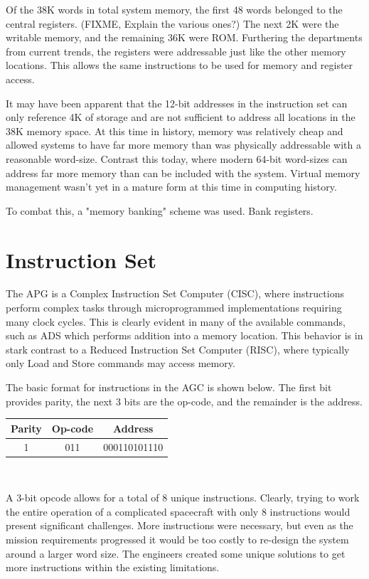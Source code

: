 \documentclass[a4paper,11pt]{article}
\begin{document}
Of the 38K words in total system memory, the first 48 words belonged to the central registers.  (FIXME, Explain the various ones?)  The next 2K were the writable memory, and the remaining 36K were ROM.  Furthering the departments from current trends, the registers were addressable just like the other memory locations.  This allows the same instructions to be used for memory and register access.  

It may have been apparent that the 12-bit addresses in the instruction set can only reference 4K of storage and are not sufficient to address all locations in the 38K memory space.  At this time in history, memory was relatively cheap and allowed systems to have far more memory than was physically addressable with a reasonable word-size.  Contrast this today, where modern 64-bit word-sizes can address far more memory than can be included with the system.  
Virtual memory management wasn't yet in a mature form at this time in computing history. 

To combat this, a "memory banking" scheme was used. Bank registers.


\section{Instruction Set}
The APG is a Complex Instruction Set Computer (CISC), where instructions perform complex tasks through microprogrammed implementations requiring many clock cycles.  This is clearly evident in many of the available commands, such as ADS which performs addition into a memory location.  This behavior is in stark contrast to a Reduced Instruction Set Computer (RISC), where typically only Load and Store commands may access memory.  

The basic format for instructions in the AGC is shown below.  The first bit provides parity, the next 3 bits are the op-code, and the remainder is the address.  

\begin{center}
\begin{tabular}{| c | c | c |}
  \hline	
  	Parity & Op-code & Address \\ \hline \hline
	1 & 011 & 000110101110 \\ \hline
\end{tabular} \\
\end{center}

A 3-bit opcode allows for a total of 8 unique instructions.  Clearly, trying to work the entire operation of a complicated spacecraft with only 8 instructions would present significant challenges.  More instructions were necessary, but even as the mission requirements progressed it would be too costly to re-design the system around a larger word size.  The engineers created some unique solutions to get more instructions within the existing limitations.
\end{document}
